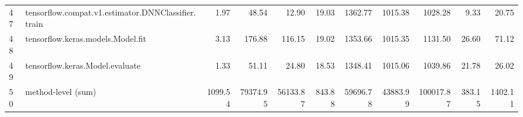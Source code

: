 \begin{tabular}{llrrrrrrrrr}
47 & tensorflow.compat.v1.estimator.DNNClassifier.train & 1.97 & 48.54 & 12.90 & 19.03 & 1362.77 & 1015.38 & 1028.28 & 9.33 & 20.75 \\
48 & tensorflow.keras.models.Model.fit & 3.13 & 176.88 & 116.15 & 19.02 & 1353.66 & 1015.35 & 1131.50 & 26.60 & 71.12 \\
49 & tensorflow.keras.Model.evaluate & 1.33 & 51.11 & 24.80 & 18.53 & 1348.41 & 1015.06 & 1039.86 & 21.78 & 26.02 \\
50 & method-level (sum) & 1099.54 & 79374.95 & 56133.87 & 843.88 & 59696.78 & 43883.99 & 100017.87 & 383.15 & 1402.11 \\
\end{tabular}
